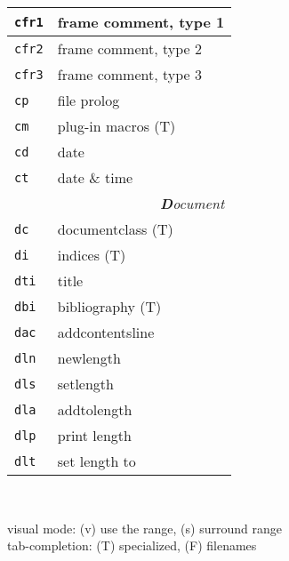 \documentclass[oneside,10pt,landscape,DIV16]{scrartcl}
\newcommand{\Map}[1] {\textbf{\textasciiacute}\texttt{#1}}
\begin{document}
\begin{multicols}{3}
\begin{center}
\begin{tabular}[]{|p{11mm}|p{60mm}|}
%
\hline     \Map{cfr1} & frame comment, type 1       \\
\hline     \Map{cfr2} & frame comment, type 2       \\
\hline     \Map{cfr3} & frame comment, type 3       \\
\hline     \Map{cp}   & file prolog                 \\
\hline     \Map{cm}   & plug-in macros              \hfill (T)\\
\hline     \Map{cd}   & date                        \\
\hline     \Map{ct}   & date \& time                \\
\hline
\hline
\multicolumn{2}{|r|}{\textsl{\textbf{D}ocument}}                 \\[1.0ex]
\hline     \Map{dc}  &  documentclass               \hfill (T)\\
\hline     \Map{di}  &  indices                     \hfill (T)\\
\hline     \Map{dti} &  title                       \\
\hline     \Map{dbi} &  bibliography                \hfill (T)\\
\hline     \Map{dac} &  addcontentsline             \\
\hline
\hline     \Map{dln} &  newlength                   \\
\hline     \Map{dls} &  setlength                   \\
\hline     \Map{dla} &  addtolength                 \\
\hline     \Map{dlp} &  print length                \\
\hline     \Map{dlt} &  set length to               \\
\hline
%
\end{tabular}\\[1.0ex]
%
\begin{minipage}[b]{72mm}%
\scriptsize{%
visual mode: {\normalsize (v)} use the range,
{\normalsize (s)} surround range \\
tab-completion: {\normalsize (T)} specialized,
{\normalsize (F)} filenames
}%
\end{minipage}

\end{center}
\end{multicols}
\end{document}
